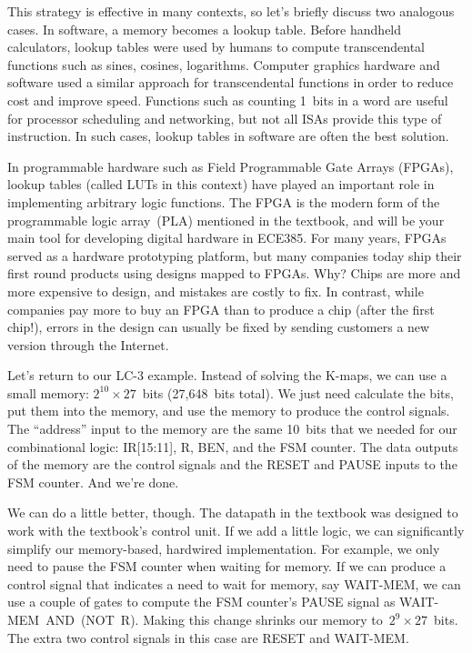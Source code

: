 This strategy is effective in many contexts, so let's briefly discuss two 
analogous cases.  In software, a memory becomes a lookup table.  Before
handheld calculators, lookup tables were used by humans to compute 
transcendental functions such as sines, cosines, logarithms.  Computer 
graphics hardware and software used a similar approach for transcendental
functions in order to reduce cost and improve 
speed.  Functions such as counting 1~bits in a word are useful for 
processor scheduling and networking, but not all ISAs provide this type
of instruction.  In such cases, lookup tables in software are often the
best solution.

In programmable hardware such as Field Programmable Gate Arrays (FPGAs),
lookup tables (called LUTs in this context) have played an important role
in implementing arbitrary logic functions.
%
The FPGA is the modern form of the programmable logic array~(PLA)
mentioned in the textbook, and will be your main tool 
for developing digital hardware in ECE385.
%
For many years, FPGAs served as a hardware prototyping platform, but
many companies today ship their first round products using 
designs mapped to FPGAs.  Why?  Chips are more and more expensive
to design, and mistakes are costly to fix.  In contrast, while
companies pay more to buy an FPGA than to produce a chip (after the 
first chip!), errors in the design can usually be fixed by sending 
customers a new version through the Internet.

Let's return to our \mbox{LC-3} example.
%
Instead of solving the \mbox{K-maps}, we can use a small memory:
$2^{10}\times{27}$~bits (27,648~bits total).
%
We just need calculate the bits, put
them into the memory, and use the memory to produce the control signals.
%
The ``address'' input to the memory are the same 10~bits that we
needed for our combinational logic: IR[15:11], R, BEN, and the FSM counter.
The data outputs of the memory are the control signals and the
RESET and PAUSE inputs to the FSM counter.  And we're done.

We can do a little better, though.  The datapath in the textbook was
designed to work with the textbook's control unit.  If we add a little
logic, we can significantly simplify our memory-based, hardwired implementation.
For example, we only need to pause the FSM counter when waiting for memory.
If we can produce a control signal that indicates a need to wait for
memory, say \mbox{WAIT-MEM}, we can use a couple of gates to compute the
FSM counter's PAUSE signal as \mbox{WAIT-MEM}~AND~(NOT~R).  Making this change
shrinks our memory to~$2^9\times{27}$~bits.  The extra two control
signals in this case are RESET and \mbox{WAIT-MEM}.

